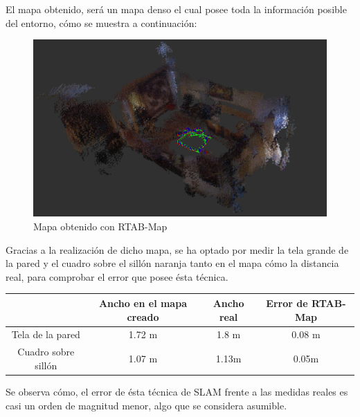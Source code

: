 El mapa obtenido, será un mapa denso el cual posee toda la información posible del entorno, cómo se muestra a continuación:
\begin{figure}[h!]
    \centering
    \includegraphics[width=.9\textwidth]{images/slam/bag1_rtabmapbonito}
    \caption{Mapa obtenido con RTAB-Map}
\end{figure}

Gracias a la realización de dicho mapa, se ha optado por medir la tela grande de la pared y el cuadro sobre el sillón naranja tanto en el mapa cómo la distancia real, para comprobar
el error que posee ésta técnica.

\begin{center}
\begin{tabular}{ c | c | c | c }
     & Ancho en el mapa creado & Ancho real & Error de RTAB-Map\\
     \hline
     Tela de la pared & 1.72 m & 1.8 m & 0.08 m\\
     Cuadro sobre sillón & 1.07 m & 1.13m & 0.05m\\
\end{tabular}
\end{center}

Se observa cómo, el error de ésta técnica de SLAM frente a las medidas reales es casi un orden de magnitud menor, algo que se considera asumible.

